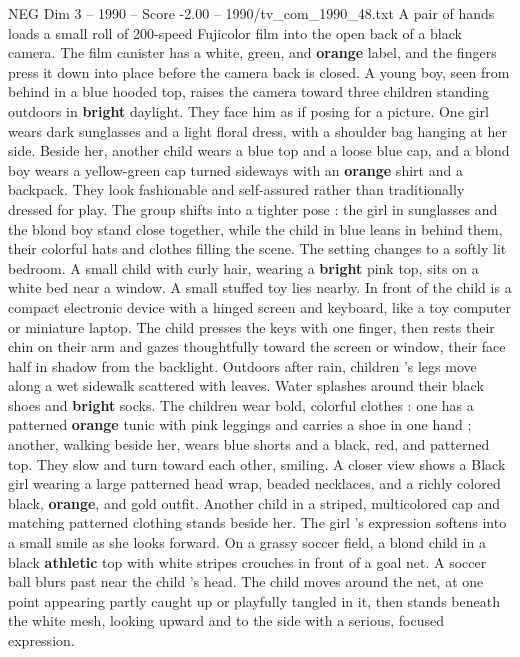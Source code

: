 \begin{textsample}{NEG Dim 3 – 1990 – Score -2.00 – 1990/tv\_com\_1990\_48.txt}  \label{ex:f3_neg_050}
A pair of hands loads a small roll of 200-speed Fujicolor film into the open back of a black camera.
The film canister has a white, green, and \textbf{orange} label, and the fingers press it down into place before the camera back is closed.
A young boy, seen from behind in a blue hooded top, raises the camera toward three children standing outdoors in \textbf{bright} daylight.
They face him as if posing for a picture.
One girl wears dark sunglasses and a light floral dress, with a shoulder bag hanging at her side.
Beside her, another child wears a blue top and a loose blue cap, and a blond boy wears a yellow-green cap turned sideways with an \textbf{orange} shirt and a backpack.
They look fashionable and self-assured rather than traditionally dressed for play.
The group shifts into a tighter pose : the girl in sunglasses and the blond boy stand close together, while the child in blue leans in behind them, their colorful hats and clothes filling the scene.
The setting changes to a softly lit bedroom.
A small child with curly hair, wearing a \textbf{bright} pink top, sits on a white bed near a window.
A small stuffed toy lies nearby.
In front of the child is a compact electronic device with a hinged screen and keyboard, like a toy computer or miniature laptop.
The child presses the keys with one finger, then rests their chin on their arm and gazes thoughtfully toward the screen or window, their face half in shadow from the backlight.
Outdoors after rain, children ’s legs move along a wet sidewalk scattered with leaves.
Water splashes around their black shoes and \textbf{bright} socks.
The children wear bold, colorful clothes : one has a patterned \textbf{orange} tunic with pink leggings and carries a shoe in one hand ; another, walking beside her, wears blue shorts and a black, red, and patterned top.
They slow and turn toward each other, smiling.
A closer view shows a Black girl wearing a large patterned head wrap, beaded necklaces, and a richly colored black, \textbf{orange}, and gold outfit.
Another child in a striped, multicolored cap and matching patterned clothing stands beside her.
The girl ’s expression softens into a small smile as she looks forward.
On a grassy soccer field, a blond child in a black \textbf{athletic} top with white stripes crouches in front of a goal net.
A soccer ball blurs past near the child ’s head.
The child moves around the net, at one point appearing partly caught up or playfully tangled in it, then stands beneath the white mesh, looking upward and to the side with a serious, focused expression.

\end{textsample}
